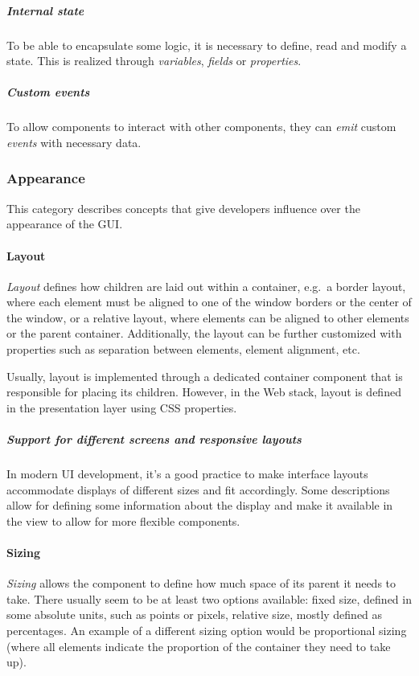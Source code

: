 \subparagraph{Internal state}
To be able to encapsulate some logic, it is necessary to define, read and modify a state.
This is realized through \emph{variables}, \emph{fields} or \emph{properties}.

\subparagraph{Custom events}
To allow components to interact with other components, they can \emph{emit} custom \emph{events} with necessary data.

\subsubsection{Appearance}
This category describes concepts that give developers influence over the appearance of the GUI\@.

\paragraph{Layout}
\emph{Layout} defines how children are laid out within a container, e.g.\ a border layout, where each element must be aligned to one of the window borders or the center of the window, or a relative layout, where elements can be aligned to other elements or the parent container.
Additionally, the layout can be further customized with properties such as separation between elements, element alignment, etc.

Usually, layout is implemented through a dedicated container component that is responsible for placing its children.
However, in the Web stack, layout is defined in the presentation layer using CSS properties.

\subparagraph{Support for different screens and responsive layouts}
In modern UI development, it's a good practice to make interface layouts accommodate displays of different sizes and fit accordingly.
Some descriptions allow for defining some information about the display and make it available in the view to allow for more flexible components.

\paragraph{Sizing}
\emph{Sizing} allows the component to define how much space of its parent it needs to take.
There usually seem to be at least two options available: fixed size, defined in some absolute units, such as points or pixels, relative size, mostly defined as percentages.
An example of a different sizing option would be proportional sizing (where all elements indicate the proportion of the container they need to take up).

